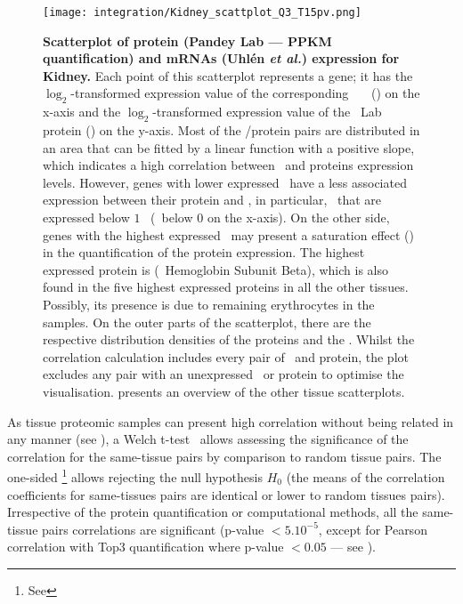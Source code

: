 \begin{figure}[!htbp]
    \texttt{[image: integration/Kidney\_scattplot\_Q3\_T15pv.png]}\centering
    \caption[Scatterplot of protein (Pandey Lab data --- PPKM quantification)
    and mRNA (Uhlén \etal) expression for Kidney]
    {\label{fig:ScatKid}\textbf{Scatterplot of
    protein (Pandey Lab --- PPKM quantification) and mRNAs (Uhlén \textit{et al.})
    expression for Kidney.}
    Each point of this scatterplot represents a gene;
    it has the $\log_2$-transformed expression value
    of the corresponding \uhlen\ \etal\ \mRNA\ (\FPKM) on the x-axis and
    the $\log_2$-transformed expression value of
    the \pandey\ Lab protein (\PPKM) on the y-axis.
    Most of the \mRNA/protein pairs are distributed in an area
    that can be fitted by a linear function with a positive slope,
    which indicates a high correlation between \mRNAs\ and proteins expression
    levels.
    However, genes with lower expressed \mRNAs\ have
    a less associated expression between their protein and \mRNA,
    in particular, \mRNAs\ that are expressed
    below $1$ \FPKM\ (\ie\ below $0$ on the x-axis).
    On the other side, genes with the highest expressed \mRNAs\ may present
    a saturation effect ()
    in the quantification of the protein expression.
    The highest expressed protein is 
    (\ie\ Hemoglobin Subunit Beta), which is also found in
    the five highest expressed proteins in all the other tissues.
    Possibly, its presence is due to remaining erythrocytes in the samples.
    On the outer parts of the scatterplot,
    there are the respective distribution densities of the proteins and the \mRNAs.
    Whilst the correlation calculation includes every pair of \mRNA\ and protein,
    the plot excludes any pair with an unexpressed \mRNA\ or protein to optimise the visualisation.
     presents an overview of the other tissue scatterplots.
    }
\end{figure}

As tissue proteomic samples can present high correlation
without being related in any manner
(see ),
a Welch t-test~ allows
assessing the significance of the correlation for the same-tissue pairs
by comparison to random tissue pairs.
The one-sided \Welchttest\footnote{See }
allows rejecting the null hypothesis $H_0$
(the means of the correlation coefficients for same-tissues pairs
are identical or lower to random tissues pairs).
Irrespective of the protein quantification or computational methods,
all the same-tissue pairs correlations are significant
(p-value $<5.10^{-5}$, except for Pearson correlation with Top3 quantification
where p-value $<0.05$ --- see ).\mybr\

